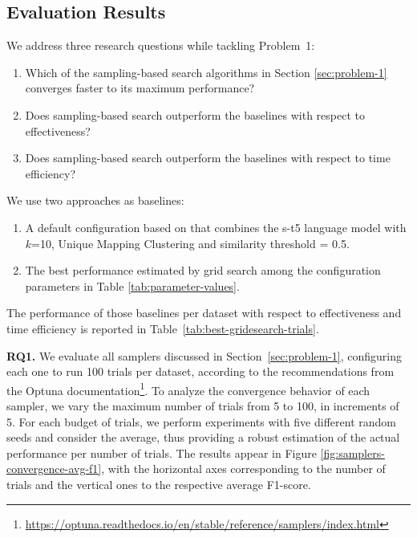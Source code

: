 



\subsection{Evaluation Results}
\label{sec:tackleProblem1}
We address three research questions while tackling Problem~1:
\begin{enumerate}[leftmargin=*, label=RQ\arabic*), start=1]
    \item Which of the sampling-based search algorithms 
    in Section \ref{sec:problem-1} converges faster 
    to its maximum performance?
    \item Does sampling-based search outperform the baselines with respect to effectiveness?
    \item Does sampling-based search outperform the baselines with respect to time efficiency?
\end{enumerate}

We use two approaches as baselines: 
\begin{enumerate}[leftmargin=*]
    \item A default configuration based on \cite{DBLP:journals/pvldb/ZeakisPSK23} that combines the s-t5 language model with $k$=10, Unique Mapping Clustering and similarity threshold = 0.5. 
    \item The best performance estimated by grid search among the configuration parameters in Table \ref{tab:parameter-values}. %
\end{enumerate}

The performance of those baselines per dataset with respect to effectiveness and time efficiency is reported in Table~\ref{tab:best-gridesearch-trials}.

\textbf{RQ1.}
We evaluate all samplers discussed in Section~\ref{sec:problem-1}, configuring each one 
to run 100 trials per dataset, according to the recommendations from the Optuna documentation\footnote{\underline{https://optuna.readthedocs.io/en/stable/reference/samplers/index.html}}. To analyze the convergence behavior of each sampler, we vary the maximum number of trials from 5 to 100, in increments of 5. For each budget of trials, we perform experiments with five different random seeds and consider the average, thus providing a robust estimation of the actual performance per number of trials. The results appear in Figure \ref{fig:samplers-convergence-avg-f1}, with the horizontal axes corresponding to the number of trials and the vertical ones to the respective average F1-score.

